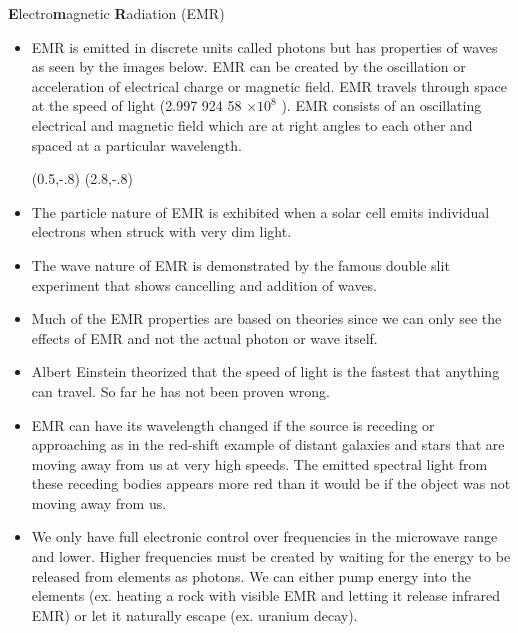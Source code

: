 {\Large {\bfseries E}lectro{\bfseries m}agnetic {\bfseries R}adiation (EMR)}
\begin{itemize}
\item EMR is emitted in discrete units called photons but has properties of waves as seen by the images below. EMR can be created by the oscillation or acceleration of electrical charge or magnetic field. EMR travels through space at the speed of light (2.997 924 58 $\times 10^{8}$ \metrepersecond ). EMR consists of an oscillating electrical and magnetic field which are at right angles to each other and spaced at a particular wavelength.

(0.5,-.8){}
(2.8,-.8){}

\vspace{2.2in}

\item The particle nature of EMR is exhibited when a solar cell emits individual electrons when struck with very dim light.

\item The wave nature of EMR is demonstrated by the famous double slit experiment that shows cancelling and addition of waves.

\item Much of the EMR properties are based on theories since we can only see the effects of EMR and not the actual photon or wave itself.

\item Albert Einstein theorized that the speed of light is the fastest that anything can travel. So far he has not been proven wrong.

\item EMR can have its wavelength changed if the source is receding or approaching as in the red-shift example of distant galaxies and stars that are moving away from us at very high speeds. The emitted spectral light from these receding bodies appears more red than it would be if the object was not moving away from us.

\item We only have full electronic control over frequencies in the microwave range and lower. Higher frequencies must be created by waiting for the energy to be released from elements as photons. We can either pump energy into the elements (ex. heating a rock with visible EMR and letting it release infrared EMR) or let it naturally escape (ex. uranium decay).


\end{itemize}
